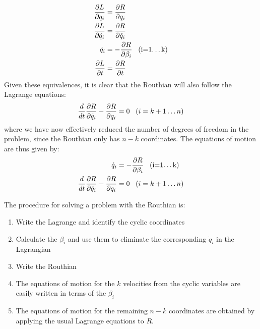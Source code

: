 \begin{align}
\frac{\partial L}{\partial q_i}&=\frac{\partial R}{\partial q_i}\nonumber\\
\frac{\partial L}{\partial \dot{q}_i}&=\frac{\partial R}{\partial \dot{q}_i}\nonumber\\
\dot{q}_i&=-\frac{\partial R}{\partial \beta_i}\;\;\;\text{(i=1\dots k)}\nonumber\\
\frac{\partial L}{\partial t}&=\frac{\partial R}{\partial t}
\end{align}
Given these equivalences, it is clear that the Routhian will also follow the Lagrange equations:
\begin{align}
\frac{d}{dt}\frac{\partial R}{\partial \dot{q}_i}-\frac{\partial R}{\partial q_i}=0\;\;\;(i=k+1\dots n)
\end{align}
where we have now effectively reduced the number of degrees of freedom in the problem, since the Routhian only has $n-k$ coordinates. The equations of motion are thus given by:
\begin{align}
\dot{q}_i&=-\frac{\partial R}{\partial \beta_i}\;\;\;\text{(i=1\dots k)}\nonumber\\
\frac{d}{dt}\frac{\partial R}{\partial \dot{q}_i}-\frac{\partial R}{\partial q_i}&=0\;\;\;(i=k+1\dots n)
\end{align}

The procedure for solving a problem with the Routhian is:
\begin{enumerate}
\item Write the Lagrange and identify the cyclic coordinates
\item Calculate the $\beta_i$ and use them to eliminate the corresponding $\dot{q}_i$ in the Lagrangian
\item Write the Routhian
\item The equations of motion for the $k$ velocities from the cyclic variables are easily written in terms of the $\beta_i$ 
\item The equations of motion for the remaining $n-k$ coordinates are obtained by applying the usual Lagrange equations to $R$.
\end{enumerate}

